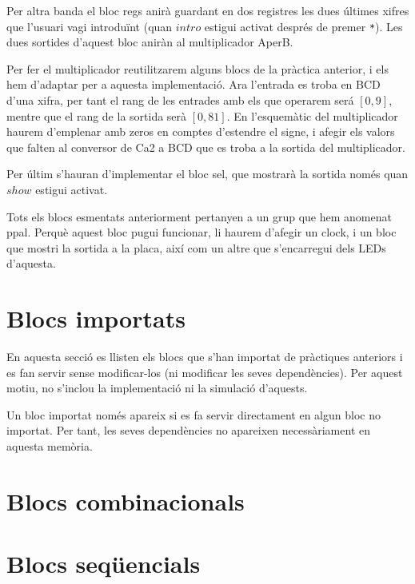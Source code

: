 Per altra banda el bloc \textsf{regs} anirà guardant en dos registres les dues últimes xifres que l'usuari vagi introduïnt (quan $intro$ estigui activat després de premer \texttt{*}). Les dues sortides d'aquest bloc aniràn al multiplicador \textsf{AperB}.

Per fer el multiplicador reutilitzarem alguns blocs de la pràctica anterior, i els hem d'adaptar per a aquesta implementació. Ara l'entrada es troba en BCD d'una xifra, per tant el rang de les entrades amb els que operarem será $\left[0,9\right]$, mentre que el rang de la sortida serà $\left[0,81\right]$. En l'esquemàtic del multiplicador haurem d'emplenar amb zeros en comptes d'estendre el signe, i afegir els valors que falten al conversor de Ca2 a BCD que es troba a la sortida del multiplicador. 

Per últim s'hauran d'implementar el bloc \textsf{sel}, que mostrarà la sortida només quan $show$ estigui activat.

Tots els blocs esmentats anteriorment pertanyen a un grup que hem anomenat \textsf{ppal}. Perquè aquest bloc pugui funcionar, li haurem d'afegir un clock, i un bloc que mostri la sortida a la placa, així com un altre que s'encarregui dels LEDs d'aquesta.

\section{Blocs importats}

En aquesta secció es llisten els blocs que s'han importat de pràctiques
anteriors i es fan servir sense modificar-los (ni modificar les seves
dependències). Per aquest motiu, no s'inclou la implementació ni la
simulació d'aquests.

Un bloc importat només apareix si es fa servir directament en algun bloc
no importat. Per tant, les seves dependències no apareixen necessàriament
en aquesta memòria.


\section{Blocs combinacionals}

\section{Blocs seqüencials}


